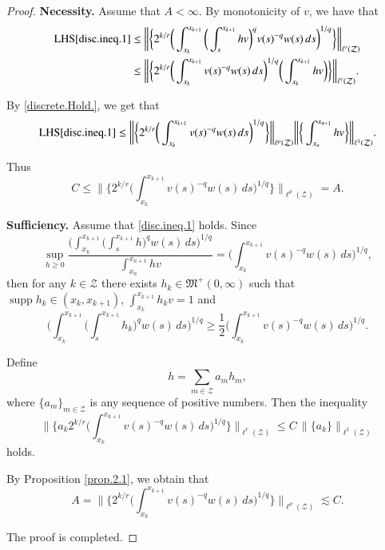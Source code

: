 \documentclass[12pt]{amsart}
\theoremstyle{plain}
\theoremstyle{definition}
\numberwithin{thm}{section}
\numberwithin{equation}{section}
\begin{document}
\begin{proof} {\bf Necessity.}	Assume that $A < \infty$.	By monotonicity of $v$, we have that
	\begin{align*}
	{\operatorname{LHS}} \eqref{disc.ineq.1} & \le \bigg\| \bigg\{ 2^{k / r} \bigg( \int_{x_k}^{x_{k+1}}\bigg( \int_s^{x_{k+1}} h v\bigg)^q v(s)^{-q} w(s)\,ds\bigg)^{ 1 / q} \bigg\} \bigg\|_{\ell^r({\mathcal Z})} \\
    & \le \bigg\| \bigg\{ 2^{k / r} \bigg( \int_{x_k}^{x_{k+1}} v(s)^{-q} 
	w(s)\,ds\bigg)^{ 1 / q} \bigg( \int_{x_k}^{x_{k+1}} h v\bigg)\bigg\} \bigg\|_{\ell^r({\mathcal Z})}.	
	\end{align*} 

	By \eqref{discrete.Hold.}, we get that
	$$
	{\operatorname{LHS}} \eqref{disc.ineq.1} \le 
	\bigg\| \bigg\{ 2^{k / r} \bigg( \int_{x_k}^{x_{k+1}} v(s)^{-q} w(s)\,ds\bigg)^{ 1 / q} \bigg\} \bigg\|_{\ell^{\rho}({\mathcal Z})}  \bigg\| \bigg\{ \int_{x_n}^{x_{n+1}} h v \bigg\} \bigg\|_{\ell^1 ({\mathcal Z})}.
	$$ 

	Thus	
    $$
    C \le \bigg\| \bigg\{ 2^{k / r} \bigg( \int_{x_k}^{x_{k+1}} v(s)^{-q} w(s)\,ds\bigg)^{ 1 / q} \bigg\} \bigg\|_{\ell^{\rho}({\mathcal Z})} = A.
    $$	
    
    {\bf Sufficiency.}	Assume that \eqref{disc.ineq.1} holds. Since
    $$
    \sup_{h \ge 0} \frac{\bigg(	\int_{x_k}^{x_{k+1}} \bigg( \int_s^{x_{k+1}} h \bigg)^q
   	w(s)\,ds\bigg)^{ 1 / q}}{\int_{x_n}^{x_{n+1}} h v} = \bigg( \int_{x_k}^{x_{k+1}} v(s)^{-q} w(s)\,ds\bigg)^{ 1 / q},
    $$
    then for any $k \in {\mathcal Z}$ there exists $h_k \in {{\mathfrak M}}^+(0,\infty)$ such that ${\operatorname{supp}} h_k \in (x_k,x_{k+1})$, $\int_{x_k}^{x_{k+1}} h_k v = 1$ and
    $$
    \bigg(	\int_{x_k}^{x_{k+1}} \bigg( \int_s^{x_{k+1}} h_k \bigg)^q
    w(s)\,ds\bigg)^{ 1 / q} \ge \frac{1}{2} \bigg( \int_{x_k}^{x_{k+1}} v(s)^{-q} w(s)\,ds\bigg)^{ 1 / q}.
    $$

    Define
    \begin{equation}\label{g}
    	h = \sum_{m \in {\mathcal Z}} a_m h_m,
    \end{equation}
    where $\{a_m\}_{m \in {\mathcal Z}}$ is any sequence of positive numbers. Then the inequality
    \begin{equation}\label{disc.ineq.1.1}
    \bigg\| \bigg\{ a_k 2^{k / r} \bigg( \int_{x_k}^{x_{k+1}} v(s)^{-q} w(s)\,ds\bigg)^{ 1 / q} \bigg\} \bigg\|_{\ell^r ({\mathcal Z})} \le C \, \|\{a_k\}\|_{\ell^1({\mathcal Z})}
    \end{equation}
    holds. 
    
    By Proposition \ref{prop.2.1}, we obtain that
    $$
    A = \bigg\| \bigg\{2^{k / r} \bigg( \int_{x_k}^{x_{k+1}} v(s)^{-q} w(s)\,ds\bigg)^{ 1 / q}\bigg\}\bigg\|_{\ell^{\rho}({\mathcal Z})} \lesssim C.
    $$
    
    The proof is completed.
\end{proof}
\end{document}

